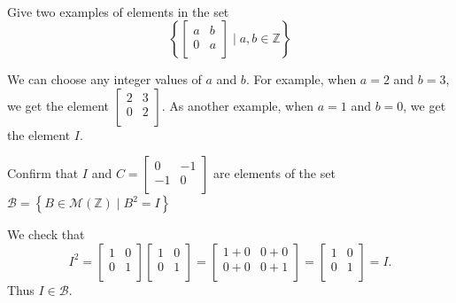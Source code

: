 \begin{exam}
\label{exam_matrix_sets}
~
    \begin{apart}
        \item Give two examples of elements in the set 
            $$\left\{\left[ \begin{array}{cc} a & b \\ 0 & a \\ \end{array} \right] \mid a, b \in \mathbb{Z} \right\} $$ 
            \begin{soln}
                We can choose any integer values of $a$ and $b$.  For example, when $a = 2$ and $b=3$, we get the element $\left[ \begin{array}{cc} 2 & 3 \\ 0 & 2 \\ \end{array} \right]$.  As another example, when $a = 1$ and $b=0$, we get the element $I$.
            \end{soln}
        \item Confirm that $I$ and $C = \left[ \begin{array}{cc} 0 & -1 \\ -1 & 0\\ \end{array} \right]$ are elements of the set $\mathscr{B} = \left\{ B \in \mathscr{M}(\mathbb{Z}) \mid B^2=I \right\}$
            \begin{soln}
                We check that $$I^2 = 
                \left[ \begin{array}{cc} 1 & 0 \\ 0 & 1\\ \end{array} \right]
                \left[ \begin{array}{cc} 1 & 0 \\ 0 & 1\\ \end{array} \right] = 
                \left[ \begin{array}{cc} 1+0 & 0+0 \\ 0+0 & 0+1\\ \end{array} \right] = 
                \left[ \begin{array}{cc} 1 & 0 \\ 0 & 1\\ \end{array} \right] = I.$$
                Thus $I \in \mathscr{B}$.

\end{soln}
\end{apart}
\end{exam}
